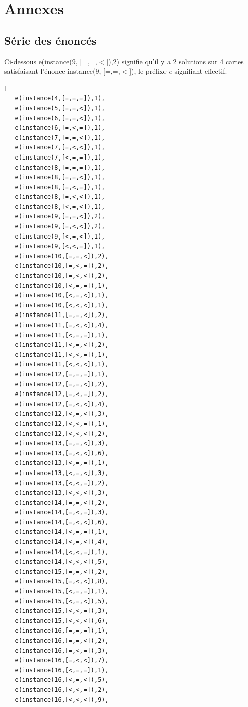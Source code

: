\documentclass[a4paper, 12]{article}
\begin{document}
\section{Annexes}

\subsection{Série des énoncés}

\label{annexe1}

Ci-dessous e(instance($9$, [=,=,$<$]),2) signifie qu’il y a 2 solutions sur 4 cartes satisfaisant l’énonce instance($9$, [=,=,$<$]), le préfixe $e$ signifiant effectif.

\begin{verbatim}
[
   e(instance(4,[=,=,=]),1),
   e(instance(5,[=,=,<]),1),
   e(instance(6,[=,=,<]),1),
   e(instance(6,[=,<,=]),1),
   e(instance(7,[=,=,<]),1),
   e(instance(7,[=,<,<]),1),
   e(instance(7,[<,=,=]),1),
   e(instance(8,[=,=,=]),1),
   e(instance(8,[=,=,<]),1),
   e(instance(8,[=,<,=]),1),
   e(instance(8,[=,<,<]),1),
   e(instance(8,[<,=,<]),1),
   e(instance(9,[=,=,<]),2),
   e(instance(9,[=,<,<]),2),
   e(instance(9,[<,=,<]),1),
   e(instance(9,[<,<,=]),1),
   e(instance(10,[=,=,<]),2),
   e(instance(10,[=,<,=]),2),
   e(instance(10,[=,<,<]),2),
   e(instance(10,[<,=,=]),1),
   e(instance(10,[<,=,<]),1),
   e(instance(10,[<,<,<]),1),
   e(instance(11,[=,=,<]),2),
   e(instance(11,[=,<,<]),4),
   e(instance(11,[<,=,=]),1),
   e(instance(11,[<,=,<]),2),
   e(instance(11,[<,<,=]),1),
   e(instance(11,[<,<,<]),1),
   e(instance(12,[=,=,=]),1),
   e(instance(12,[=,=,<]),2),
   e(instance(12,[=,<,=]),2),
   e(instance(12,[=,<,<]),4),
   e(instance(12,[<,=,<]),3),
   e(instance(12,[<,<,=]),1),
   e(instance(12,[<,<,<]),2),
   e(instance(13,[=,=,<]),3),
   e(instance(13,[=,<,<]),6),
   e(instance(13,[<,=,=]),1),
   e(instance(13,[<,=,<]),3),
   e(instance(13,[<,<,=]),2),
   e(instance(13,[<,<,<]),3),
   e(instance(14,[=,=,<]),2),
   e(instance(14,[=,<,=]),3),
   e(instance(14,[=,<,<]),6),
   e(instance(14,[<,=,=]),1),
   e(instance(14,[<,=,<]),4),
   e(instance(14,[<,<,=]),1),
   e(instance(14,[<,<,<]),5),
   e(instance(15,[=,=,<]),2),
   e(instance(15,[=,<,<]),8),
   e(instance(15,[<,=,=]),1),
   e(instance(15,[<,=,<]),5),
   e(instance(15,[<,<,=]),3),
   e(instance(15,[<,<,<]),6),
   e(instance(16,[=,=,=]),1),
   e(instance(16,[=,=,<]),2),
   e(instance(16,[=,<,=]),3),
   e(instance(16,[=,<,<]),7),
   e(instance(16,[<,=,=]),1),
   e(instance(16,[<,=,<]),5),
   e(instance(16,[<,<,=]),2),
   e(instance(16,[<,<,<]),9),

\end{verbatim}
\end{document}
